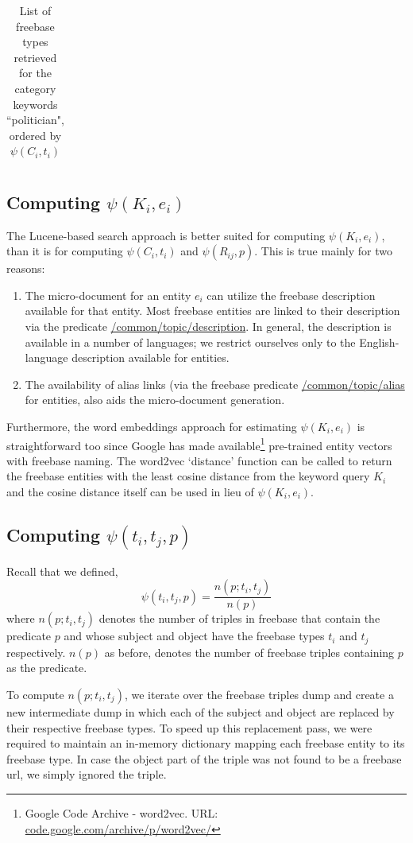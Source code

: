 \documentclass[a4paper, twoside, 12pt]{report}
\begin{document}
\begin{longtable}{| p{} | p{} |}
\caption{List of freebase types retrieved for the category keywords ``politician", ordered by $\psi(C_i,t_i)$} 
\label{tab:politician}
\end{longtable}

\subsection{Computing $\psi(K_i, e_i)$}
The Lucene-based search approach is better suited for computing $\psi(K_i, e_i)$, than it is for computing $\psi(C_i, t_i)$ and $\psi(R_{ij}, p)$. This is true mainly for two reasons:
\begin{enumerate}
\item The micro-document for an entity $e_i$ can utilize the freebase description available for that entity. Most freebase entities are linked to their description via the predicate \url{/common/topic/description}. In general, the description is available in a number of languages; we restrict ourselves only to the English-language description available for entities.
\item The availability of alias links (via the freebase predicate \url{/common/topic/alias} for entities, also aids the micro-document generation.
\end{enumerate}

Furthermore, the word embeddings approach for estimating $\psi(K_i,e_i)$ is straightforward too since Google has made available\footnote{Google Code Archive - word2vec. URL: \url{code.google.com/archive/p/word2vec/}} pre-trained entity vectors with freebase naming. The word2vec `distance' function can be called to return the freebase entities with the least cosine distance from the keyword query $K_i$ and the cosine distance itself can be used in lieu of $\psi(K_i,e_i)$. 

\subsection{Computing $\psi(t_i, t_j, p)$}
Recall that we defined, $$\psi(t_i, t_j, p) = \frac{n(p;t_i,t_j)}{n(p)}$$ where $n(p;t_i,t_j)$ denotes the number of triples in freebase that contain the predicate $p$ and whose subject and object have the freebase types $t_i$ and $t_j$ respectively. $n(p)$ as before, denotes the number of freebase triples containing $p$ as the predicate.

To compute $n(p;t_i,t_j)$, we iterate over the freebase triples dump and create a new intermediate dump in which each of the subject and object are replaced by their respective freebase types. To speed up this replacement pass, we were required to maintain an in-memory dictionary mapping each freebase entity to its freebase type. In case the object part of the triple was not found to be a freebase url, we simply ignored the triple.
\end{document}
